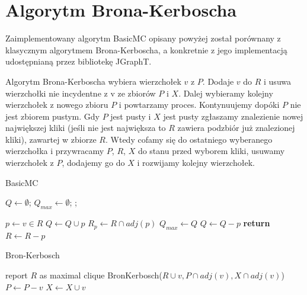 \documentclass[12pt, a4paper]{article}
\begin{document}
\section{Algorytm Brona-Kerboscha}

Zaimplementowany algorytm BasicMC opisany powyżej został porównany z klasycznym algorytmem Brona-Kerboscha, a konkretnie z jego implementacją udostępnianą przez bibliotekę JGraphT.

Algorytm Brona-Kerboscha wybiera wierzchołek $v$ z $P$. Dodaje $v$ do $R$ i usuwa wierzchołki nie incydentne z v ze zbiorów $P$ i $X$. Dalej wybieramy kolejny wierzchołek z nowego zbioru $P$ i powtarzamy proces. Kontynuujemy dopóki $P$ nie jest zbiorem pustym. Gdy $P$ jest pusty i $X$ jest pusty zgłaszamy znalezienie nowej największej kliki (jeśli nie jest największa to $R$ zawiera podzbiór już znalezionej kliki), zawartej w zbiorze $R$. Wtedy cofamy się do ostatniego wyberanego wierzchołka i przywracamy $P$, $R$, $X$ do stanu przed wyborem kliki, usuwamy wierzchołek z $P$, dodajemy go do $X$ i rozwijamy kolejny wierzchołek.\citep{bron-kerbosch}

\begin{algorithm}
\caption{BasicMC}\label{basicmc}
\begin{algorithmic}[1]
  
\State $Q\gets \emptyset$;
\State $Q_{max}\gets \emptyset$;
\State {};
\EndProcedure
\Statex

  \State $p\gets v\in R$
    \State $Q \gets Q \cup {p}$\label{addPToQ}
    \State $R_p \gets R \cap adj(p)$
      \State {}
      \State $Q_{max} \gets Q$
    \EndIf
    \State $Q \gets Q - {p}$
  \Else
    \textbf{ return}\label{skip}
  \EndIf
  \State $R \gets R - p$
\EndWhile
\EndProcedure

\end{algorithmic}
\end{algorithm}

\begin{algorithm}
\caption{Bron-Kerbosch}\label{bron-kerbosch}
\begin{algorithmic}[1]
  
    \State report $R$ as maximal clique
  \EndIf
    \State BronKerbosch($R \cup v, P \cap adj(v), X \cap adj(v)$)
    \State $P \gets P - v$
    \State $X \gets X \cup v$
  \EndFor
\EndProcedure

\end{algorithmic}
\end{algorithm}
\end{document}
